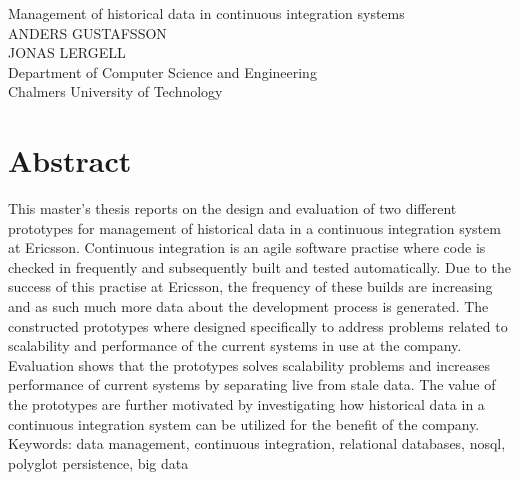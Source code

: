 Management of historical data in continuous integration systems\\
ANDERS GUSTAFSSON\\
JONAS LERGELL\\
Department of Computer Science and Engineering\\
Chalmers University of Technology\\

\thispagestyle{plain}			%
\section*{Abstract}
This master's thesis reports on the design and evaluation of two different prototypes for management of historical data in a continuous integration system at Ericsson. Continuous integration is an agile software practise where code is checked in frequently and subsequently built and tested automatically. Due to the success of this practise at Ericsson, the frequency of these builds are increasing and as such much more data about the development process is generated. The constructed prototypes where designed specifically to address problems related to scalability and performance of the current systems in use at the company. Evaluation shows that the prototypes solves scalability problems and increases performance of current systems by separating live from stale data. The value of the prototypes are further motivated by investigating how historical data in a continuous integration system can be utilized for the benefit of the company.
\vfill
Keywords: data management, continuous integration, relational databases, nosql, polyglot persistence, big data

\newpage				%
\thispagestyle{empty}
\mbox{}